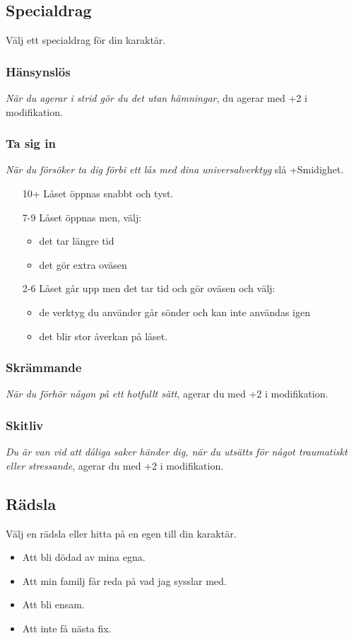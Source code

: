 \documentclass[a5paper,10pt]{article}
\begin{document}
\subsection{Specialdrag}
Välj ett specialdrag för din karaktär.
\subsubsection{Hänsynslös}
\textit{När du agerar i strid gör du det utan hämningar}, du agerar med +2 i modifikation.
\subsubsection{Ta sig in}
\textit{När du försöker ta dig förbi ett lås med dina universalverktyg} slå +Smidighet.
\begin{itemize}
  \item[10+] Låset öppnas snabbt och tyst.
  \item[7-9] Låset öppnas men, välj:
  \begin{itemize}
    \item det tar längre tid
    \item det gör extra oväsen
  \end{itemize}
  \item[2-6] Låset går upp men det tar tid och gör oväsen och välj:
  \begin{itemize}
    \item de verktyg du använder går sönder och kan inte användas igen
    \item det blir stor åverkan på låset.
  \end{itemize}
\end{itemize}
\subsubsection{Skrämmande}
\textit{När du förhör någon på ett hotfullt sätt}, agerar du med +2 i modifikation.
\subsubsection{Skitliv}
\textit{Du är van vid att dåliga saker händer dig, när du utsätts för något traumatiskt eller stressande}, agerar du med +2 i modifikation.
\subsection{Rädsla}
Välj en rädsla eller hitta på en egen till din karaktär.
\begin{itemize}
  \item Att bli dödad av mina egna.
  \item Att min familj får reda på vad jag sysslar med.
  \item Att bli ensam.
  \item Att inte få nästa fix.
\end{itemize}
\end{document}
